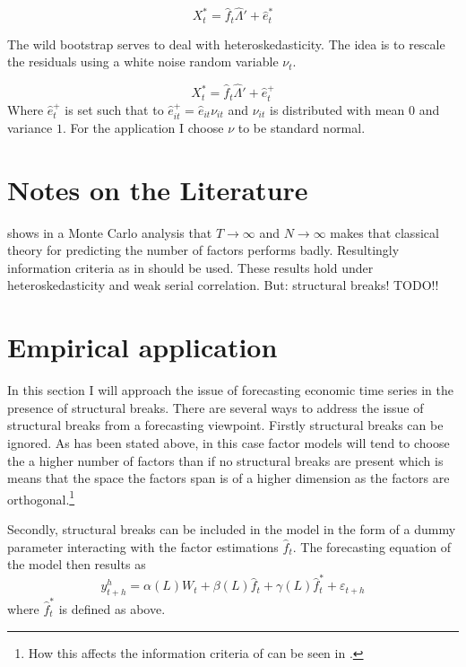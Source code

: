 \documentclass[11pt]{article}
\begin{document}
\begin{equation}
	\label{factor equation, bootstrapped}
	X_t^* = \hat f_t \hat \Lambda' + \hat e_t^*
\end{equation}

The wild bootstrap serves to deal with heteroskedasticity. The idea is to rescale the residuals using a white noise random variable $\nu_t$.

$$X_t^* = \hat f_t \hat \Lambda' + \hat e_t^+$$
Where $\hat e_t^+$ is set such that to $\hat e_{it}^+ = \hat e_{it} \nu_{it}$ and $\nu_{it}$ is distributed with mean $0$ and variance $1$. For the application I choose $\nu$ to be standard normal.




\section{Notes on the Literature}
\citet{cragg1997inferring} shows in a Monte Carlo analysis that $T\rightarrow\infty$ and $N\rightarrow\infty$ makes that classical theory for predicting the number of factors performs badly. Resultingly information criteria as in \citet{bai2002determining} should be used. These results hold under heteroskedasticity and weak serial correlation. But: structural breaks! TODO!!




\section{Empirical application}
In this section I will approach the issue of forecasting economic time series in the presence of structural breaks.
There are several ways to address the issue of structural breaks from a forecasting viewpoint. Firstly structural breaks can be ignored. As has been stated above, in this case factor models will tend to choose the a higher number of factors than if no structural breaks are present which is means that the space the factors span is of a higher dimension as the factors are orthogonal.\footnote{How this affects the information criteria of \citet{bai2002determining} can be seen in \citet{breitung2011testing}.}

Secondly, structural breaks can be included in the model in the form of a dummy parameter interacting with the factor estimations $\hat f_t$. The forecasting equation of the model then results as
\begin{equation}
	\label{forecasting, structural breaks}
	y^h_{t+h} = \alpha(L) W_t + \beta(L) \hat f_t + \gamma(L) \hat f_t^* + \varepsilon_{t+h}
\end{equation}
where $\hat f_t^*$ is defined as above.
\end{document}
